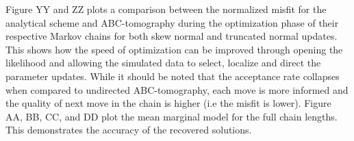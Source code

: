 Figure YY and ZZ plots a comparison between the normalized misfit for the analytical scheme and ABC-tomography during the optimization phase of their respective Markov chains for both skew normal and truncated normal updates. This shows how the speed of optimization can be improved through opening the likelihood and allowing the simulated data to select, localize and direct the parameter updates. While it should be noted that the acceptance rate collapses when compared to undirected ABC-tomography, each move is more informed and the quality of next move in the chain is higher (i.e the misfit is lower). Figure AA, BB, CC, and DD plot the mean marginal model for the full chain lengths. This demonstrates the accuracy of the recovered solutions. \par



